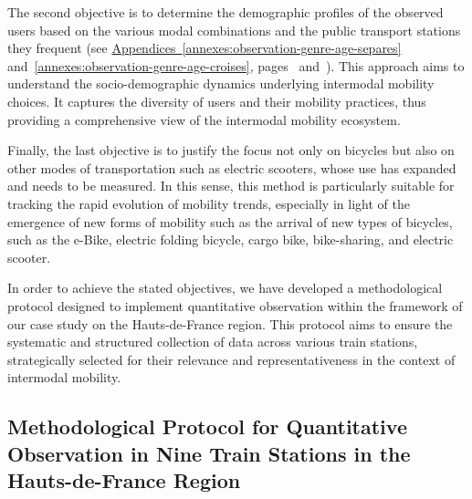 \begin{refsegment}
The second objective is to determine the demographic profiles of the observed users based on the various modal combinations and the public transport stations they frequent (see \hyperref[annexes:observation-genre-age-separes]{Appendices~\ref{annexes:observation-genre-age-separes}} and~\ref{annexes:observation-genre-age-croises}, pages~\pageref{annexes:observation-genre-age-separes} and~\pageref{annexes:observation-genre-age-croises}). This approach aims to understand the socio-demographic dynamics underlying intermodal mobility choices. It captures the diversity of users and their mobility practices, thus providing a comprehensive view of the intermodal mobility ecosystem.%

Finally, the last objective is to justify the focus not only on bicycles but also on other modes of transportation such as electric scooters, whose use has expanded and needs to be measured. In this sense, this method is particularly suitable for tracking the rapid evolution of mobility trends, especially in light of the emergence of new forms of mobility such as the arrival of new types of bicycles, such as the \acrfull{e-Bike}, electric folding bicycle, cargo bike, bike-sharing, and electric scooter.%

In order to achieve the stated objectives, we have developed a methodological protocol designed to implement quantitative observation within the framework of our case study on the Hauts-de-France region. This protocol aims to ensure the systematic and structured collection of data across various train stations, strategically selected for their relevance and representativeness in the context of intermodal mobility.%

\subsection{Methodological Protocol for Quantitative Observation in Nine Train Stations in the Hauts-de-France Region
    \label{chap3:methodologie-observation-quantitative}
    }


\end{refsegment}
